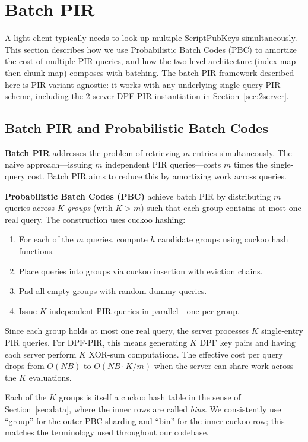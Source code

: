 \section{Batch PIR}
\label{sec:batching}

A light client typically needs to look up multiple ScriptPubKeys simultaneously. This section describes how we use Probabilistic Batch Codes (PBC) to amortize the cost of multiple PIR queries, and how the two-level architecture (index map then chunk map) composes with batching. The batch PIR framework described here is PIR-variant-agnostic: it works with any underlying single-query PIR scheme, including the 2-server DPF-PIR instantiation in Section~\ref{sec:2server}.

\subsection{Batch PIR and Probabilistic Batch Codes}

\textbf{Batch PIR} \cite{IKOS04} addresses the problem of retrieving $m$ entries simultaneously. The naive approach---issuing $m$ independent PIR queries---costs $m$ times the single-query cost. Batch PIR aims to reduce this by amortizing work across queries.

\textbf{Probabilistic Batch Codes (PBC)} achieve batch PIR by distributing $m$ queries across $K$ \emph{groups} (with $K > m$) such that each group contains at most one real query. The construction uses cuckoo hashing:
\begin{enumerate}[nolistsep,leftmargin=*]
    \item For each of the $m$ queries, compute $h$ candidate groups using cuckoo hash functions.
    \item Place queries into groups via cuckoo insertion with eviction chains.
    \item Pad all empty groups with random dummy queries.
    \item Issue $K$ independent PIR queries in parallel---one per group.
\end{enumerate}

Since each group holds at most one real query, the server processes $K$ single-entry PIR queries. For DPF-PIR, this means generating $K$ DPF key pairs and having each server perform $K$ XOR-sum computations. The effective cost per query drops from $O(NB)$ to $O(NB \cdot K/m)$ when the server can share work across the $K$ evaluations.

Each of the $K$ groups is itself a cuckoo hash table in the sense of Section~\ref{sec:data}, where the inner rows are called \emph{bins}. We consistently use ``group'' for the outer PBC sharding and ``bin'' for the inner cuckoo row; this matches the terminology used throughout our codebase.

